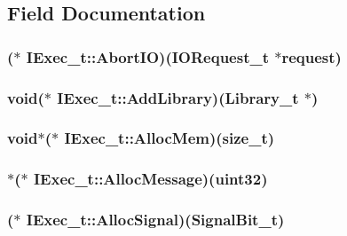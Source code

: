 \subsection{Field Documentation}
\hypertarget{structIExec__t_a6002eecac16603535f0868151903fd12}{
\subsubsection[{Abort\+I\+O}]{($\ast$ I\+Exec\+\_\+t\+::\+Abort\+I\+O)({\bf I\+O\+Request\+\_\+t} $\ast$request)}}\label{structIExec__t_a6002eecac16603535f0868151903fd12}
\hypertarget{structIExec__t_abf7df7580fee75647be527cda9b1d7ad}{
\subsubsection[{Add\+Library}]{\setlength{\rightskip}{0pt plus 5cm}void($\ast$ I\+Exec\+\_\+t\+::\+Add\+Library)({\bf Library\+\_\+t} $\ast$)}}\label{structIExec__t_abf7df7580fee75647be527cda9b1d7ad}
\hypertarget{structIExec__t_acd40d2c369a62c5f5a03b852665e87be}{
\subsubsection[{Alloc\+Mem}]{\setlength{\rightskip}{0pt plus 5cm}void$\ast$($\ast$ I\+Exec\+\_\+t\+::\+Alloc\+Mem)({\bf size\+\_\+t})}}\label{structIExec__t_acd40d2c369a62c5f5a03b852665e87be}
\hypertarget{structIExec__t_a6ed4cf5e735ccb663691c9a61018288c}{
\subsubsection[{Alloc\+Message}]{$\ast$($\ast$ I\+Exec\+\_\+t\+::\+Alloc\+Message)({\bf uint32})}}\label{structIExec__t_a6ed4cf5e735ccb663691c9a61018288c}
\hypertarget{structIExec__t_a7fc67200d9bbb9be8c91910c44b9b8a2}{
\subsubsection[{Alloc\+Signal}]{($\ast$ I\+Exec\+\_\+t\+::\+Alloc\+Signal)({\bf Signal\+Bit\+\_\+t})}}\label{structIExec__t_a7fc67200d9bbb9be8c91910c44b9b8a2}
